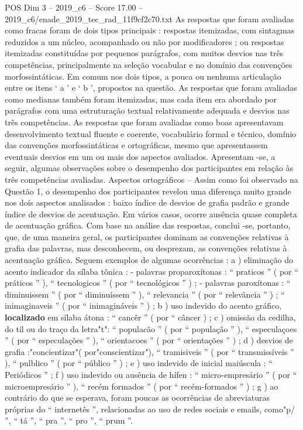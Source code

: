 \begin{textsample}{POS Dim 3 – 2019\_c6 – Score 17.00 – 2019\_c6/enade\_2019\_tec\_rad\_11f9cf2c70.txt}
As respostas que foram avaliadas como fracas foram de dois tipos principais : respostas itemizadas, com sintagmas reduzidos a um núcleo, acompanhado ou não por modificadores ; ou respostas itemizadas constituídas por pequenos parágrafos, com muitos desvios nas três competências, principalmente na seleção vocabular e no domínio das convenções morfossintáticas.
Em comum nos dois tipos, a pouca ou nenhuma articulação entre os itens ‘ a ’ e ‘ b ’, propostos na questão.
As respostas que foram avaliadas como medianas também foram itemizadas, mas cada item era abordado por parágrafos com uma estruturação textual relativamente adequada e desvios nas três competências.
As respostas que foram avaliadas como boas apresentavam desenvolvimento textual fluente e coerente, vocabulário formal e técnico, domínio das convenções morfossintáticas e ortográficas, mesmo que apresentassem eventuais desvios em um ou mais dos aspectos avaliados.
Apresentam -se, a seguir, algumas observações sobre o desempenho dos participantes em relação às três competências avaliadas.
Aspectos ortográficos – Assim como foi observado na Questão 1, o desempenho dos participantes revelou uma diferença muito grande nos dois aspectos analisados : baixo índice de desvios de grafia padrão e grande índice de desvios de acentuação.
Em vários casos, ocorre ausência quase completa de acentuação gráfica.
Com base na análise das respostas, conclui -se, portanto, que, de uma maneira geral, os participantes dominam as convenções relativas à grafia das palavras, mas desconhecem, ou desprezam, as convenções relativas à acentuação gráfica.
Seguem exemplos de algumas ocorrências : a ) eliminação do acento indicador da sílaba tônica : - palavras proparoxítonas : “ praticos ” ( por “ práticos ” ), “ tecnologicos ” ( por “ tecnológicos ” ) ; - palavras paroxítonas : “ diminuissem ” ( por “ diminuíssem ” ), “ relevancia ” ( por “ relevância ” ) ; “ inimaginaveis ” ( por “ inimagináveis ” ) ; b ) uso indevido do acento gráfico, \textbf{localizado} em sílaba átona : “ cancêr ” ( por “ câncer ) ; c ) omissão da cedilha, do til ou do traço da letra"t": “ populacão ” ( por “ população ” ), “ especulaçoes ” ( por “ especulações ” ), “ orientacoes ” ( por “ orientações ” ) ; d ) desvios de grafia :"concientizar"( por"conscientizar"), “ tramisiveis ” ( por “ transmissíveis ” ), “ pulblico ” ( por “ público ” ) ; e ) uso indevido de inicial maiúscula : “ Periódicos ” ; f ) uso indevido ou ausência de hífen : “ micro-empresário ” ( por “ microempresário ” ), “ recém formados ” ( por “ recém-formados ” ) ; g ) ao contrário do que se esperava, foram poucas as ocorrências de abreviaturas próprias do “ internetês ”, relacionadas ao uso de redes sociais e emails, como"p/ ”, “ tá ”, “ pra ”, “ pro ”, “ prum ”.

\end{textsample}
